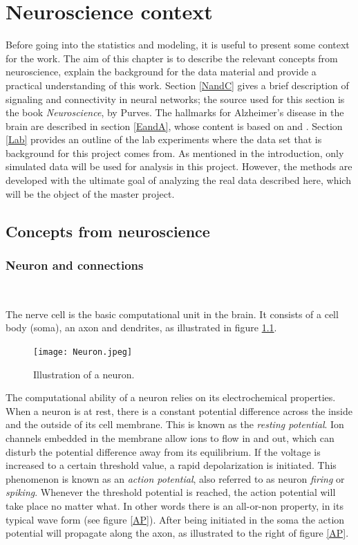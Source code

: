 
\chapter{Neuroscience context}
\label{ch:2}

Before going into the statistics and modeling, it is useful to present some context for the work. The aim of this chapter is to describe the relevant concepts from neuroscience, explain the background for the data material and provide a practical understanding of this work. Section \ref{NandC} gives a brief description of signaling and connectivity in neural networks; the source used for this section is the book \textit{Neuroscience}, by Purves. The hallmarks for Alzheimer's disease in the brain are described in section \ref{EandA}, whose content is based on \cite{Gomez} and \cite{Witter:2011}. Section \ref{Lab} provides an outline of the lab experiments where the data set that is background for this project comes from. As mentioned in the introduction, only simulated data will be used for analysis in this project. However, the methods are developed with the ultimate goal of analyzing the real data described here, which will be the object of the master project. 

\section{Concepts from neuroscience}

\subsection{Neuron and connections}\\
\label{NandC}

 The nerve cell is the basic computational unit in the brain. It consists of a cell body (soma), an axon and dendrites, as illustrated in figure \ref{neuron}.
\begin{figure}[h]
    \caption{Illustration of a neuron.}
    \label{neuron}
    \centering
    \texttt{[image: Neuron.jpeg]}
\end{figure} 

The computational ability of a neuron relies on its electrochemical properties. When a neuron is at rest, there is a constant potential difference across the inside and the outside of its cell membrane. This is known as the \textit{resting potential}. Ion channels embedded in the membrane allow ions to flow in and out, which can disturb the potential difference away from its equilibrium. If the voltage is increased to a certain threshold value, a rapid depolarization is initiated. This phenomenon is known as an \textit{action potential}, also referred to as neuron \textit{firing} or \textit{spiking}. Whenever the threshold potential is reached, the action potential will take place no matter what. In other words there is an all-or-non property, in its typical wave form (see figure \ref{AP}). After being initiated in the soma the action potential will propagate along the axon, as illustrated to the right of figure \ref{AP}.

